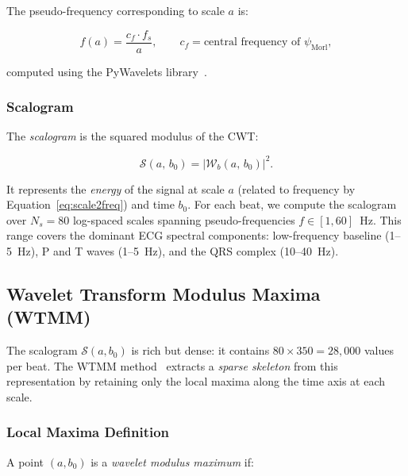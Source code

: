 \documentclass[12pt, a4paper]{article}
\newcommand{\abs}[1]{\left|#1\right|}
\newcommand{\scalogram}{\mathcal{S}}
\newcommand{\CWT}{\mathcal{W}}
\begin{document}
The pseudo-frequency corresponding to scale $a$ is:

\begin{mathbox}
\begin{equation}
  f(a) = \frac{c_f \cdot f_s}{a},
  \qquad
  c_f = \text{central frequency of }\psi_{\text{Morl}},
  \label{eq:scale2freq}
\end{equation}
\end{mathbox}

\noindent computed using the PyWavelets library~\cite{lee2019}.

\subsubsection{Scalogram}

The \textit{scalogram} is the squared modulus of the CWT:

\begin{mathbox}
\begin{equation}
  \scalogram(a,\, b_0)
  = \abs{\CWT_b(a,\, b_0)}^2.
  \label{eq:scalogram}
\end{equation}
\end{mathbox}

It represents the \textit{energy} of the signal at scale $a$ (related to
frequency by Equation~\ref{eq:scale2freq}) and time $b_0$.
For each beat, we compute the scalogram over $N_s = 80$ log-spaced scales
spanning pseudo-frequencies $f \in [1, 60]$~Hz.
This range covers the dominant ECG spectral components:
low-frequency baseline (1--5~Hz), P and T waves (1--5~Hz),
and the QRS complex (10--40~Hz).

\subsection{Wavelet Transform Modulus Maxima (WTMM)}

The scalogram $\scalogram(a, b_0)$ is rich but dense: it contains
$80 \times 350 = 28{,}000$ values per beat.
The WTMM method~\cite{mallat1992} extracts a \textit{sparse skeleton}
from this representation by retaining only the local maxima along the time
axis at each scale.

\subsubsection{Local Maxima Definition}

A point $(a, b_0)$ is a \textit{wavelet modulus maximum} if:
\end{document}
